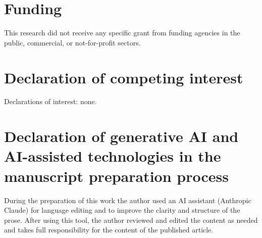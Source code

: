 \documentclass[aps,prx,reprint,amsmath,amssymb,floatfix,superscriptaddress,nofootinbib]{revtex4-2}
\theoremstyle{plain-thm}
\theoremstyle{definition-thm}
\begin{document}
\section*{Funding}
This research did not receive any specific grant from funding agencies in the public, commercial, or not-for-profit sectors.

\section*{Declaration of competing interest}
Declarations of interest: none.

\section*{Declaration of generative AI and AI-assisted technologies in the manuscript preparation process}
During the preparation of this work the author used an AI assistant (Anthropic Claude) for language editing and to improve the clarity and structure of the prose. After using this tool, the author reviewed and edited the content as needed and takes full responsibility for the content of the published article.




\end{document}
